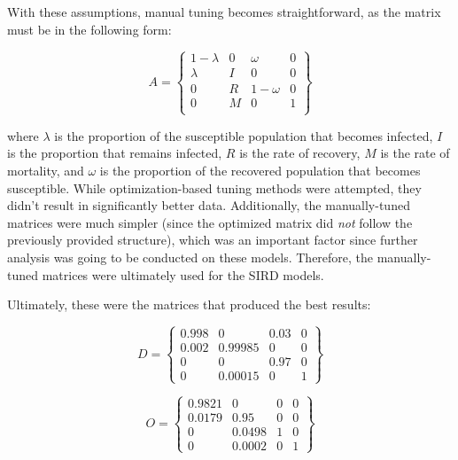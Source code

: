 \documentclass[conference]{IEEEtran}
\begin{document}
With these assumptions, manual tuning becomes straightforward, as the matrix must be in the following form:

\begin{equation}
A = \begin{Bmatrix}
  1 - \lambda & 0 & \omega      & 0 \\
  \lambda     & I & 0           & 0 \\
  0           & R & 1 - \omega  & 0 \\
  0           & M & 0           & 1 \\
\end{Bmatrix}
\end{equation}

where $\lambda$ is the proportion of the susceptible population that becomes infected, $I$ is the proportion that remains infected, $R$ is the rate of recovery, $M$ is the rate of mortality, and $\omega$ is the proportion of the recovered population that becomes susceptible. While optimization-based tuning methods were attempted, they didn't result in significantly better data. Additionally, the manually-tuned matrices were much simpler (since the optimized matrix did \textit{not} follow the previously provided structure), which was an important factor since further analysis was going to be conducted on these models. Therefore, the manually-tuned matrices were ultimately used for the SIRD models.

Ultimately, these were the matrices that produced the best results:

\begin{equation}
D = \begin{Bmatrix}
0.998 & 0 & 0.03 & 0 \\
0.002 & 0.99985 & 0 & 0 \\
0 & 0 & 0.97 & 0 \\
0 & 0.00015 & 0 & 1
\end{Bmatrix}
\end{equation}

\begin{equation}
O = \begin{Bmatrix}
0.9821 & 0 & 0 & 0 \\
0.0179 & 0.95 & 0 & 0 \\
0 & 0.0498 & 1 & 0 \\
0 & 0.0002 & 0 & 1
\end{Bmatrix}
\end{equation}
\end{document}
